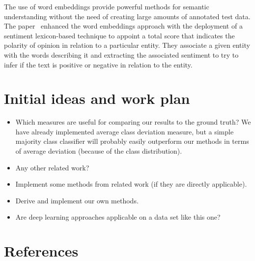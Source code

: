 \documentclass[11pt,a4paper]{article}
\begin{document}
The use of word embeddings provide powerful methods for semantic understanding without the need of creating large amounts of annotated test data. 
The paper~\cite{sweeney2017multi} enhanced the word embeddings approach with the  deployment of a sentiment lexicon-based technique to appoint a total score that indicates the polarity of opinion in relation to a particular entity. 
They associate a given entity with the words describing it and extracting the associated sentiment to try to infer if the text is positive or negative in relation to the entity.



\section{Initial ideas and work plan}

\begin{itemize}
\item Which measures are useful for comparing our results to the ground truth? We have already implemented average class deviation measure, but a simple majority class classifier will probably easily outperform our methods in terms of average deviation (because of the class distribution).
\item Any other related work?
\item Implement some methods from related work (if they are directly applicable).
\item Derive and implement our own methods.
\item Are deep learning approaches applicable on a data set like this one?
\end{itemize}



\section{References}



\end{document}
